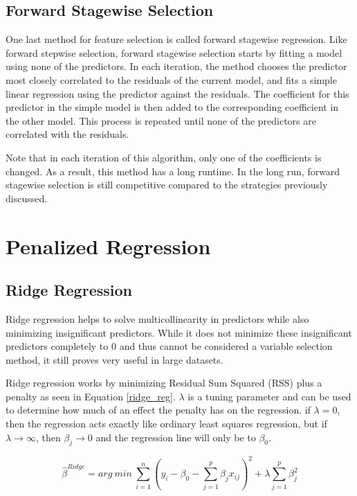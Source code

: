 \documentclass{article}
\begin{document}
\subsection{Forward Stagewise Selection}
One last method for feature selection is called forward stagewise regression. Like forward stepwise selection, forward stagewise selection starts by fitting a model using none of the predictors. In each iteration, the method chooses the predictor most closely correlated to the residuals of the current model, and fits a simple linear regression using the predictor against the residuals. The coefficient for this predictor in the simple model is then added to the corresponding coefficient in the other model. This process is repeated until none of the predictors are correlated with the residuals.

Note that in each iteration of this algorithm, only one of the coefficients is changed. As a result, this method has a long runtime. In the long run, forward stagewise selection is still competitive compared to the strategies previously discussed.

\section{Penalized Regression}
\subsection{Ridge Regression}
Ridge regression helps to solve multicollinearity in predictors while also minimizing insignificant predictors. While it does not minimize these insignificant predictors completely to 0 and thus cannot be considered a variable selection method, it still proves very useful in large datasets.

Ridge regression works by minimizing Residual Sum Squared (RSS) plus a penalty as seen in Equation \ref{ridge_reg}. $\lambda$ is a tuning parameter and can be used to determine how much of an effect the penalty has on the regression. if $\lambda=0$, then the regression acts exactly like ordinary least squares regression, but if $\lambda \rightarrow \infty$, then $\beta_j \rightarrow 0$ and the regression line will only be to $\beta_0$.

\begin{equation}
	\hat{\beta}^{Ridge} = arg \: min \: \sum_{i=1}^{n} \left( y_i - \beta_0 - \sum_{j=1}^{p} \beta_jx_{ij} \right)^2 + \lambda \sum_{j=1}^{p} \beta_j^2
	\label{ridge_reg}
\end{equation}
\end{document}
